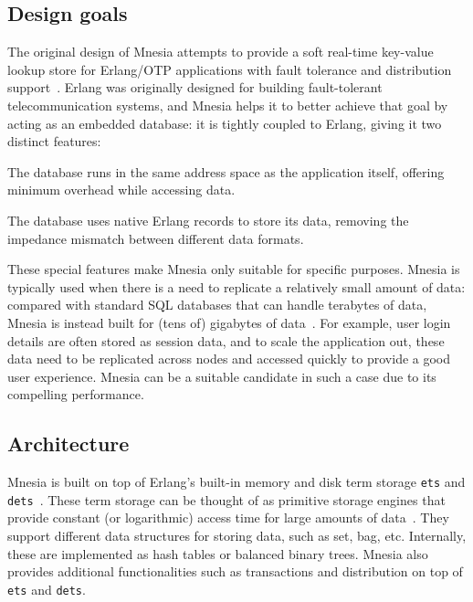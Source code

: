 \subsection{Design goals} \label{subsec:bg mnesia design goal}

The original design of Mnesia attempts to provide a soft real-time key-value
lookup store for Erlang/OTP applications with fault tolerance and distribution
support~\cite{ericssonab2023mnesiaguide}.
Erlang was originally designed for building fault-tolerant telecommunication systems,
and Mnesia helps it to better achieve that goal by acting as an embedded database: 
it is tightly coupled to Erlang, giving it two distinct features:
\begin{enumerate*}[(a)]
  \item The database runs in the same address space as the application itself,
  offering minimum overhead while accessing data.
  \item The database uses native Erlang records to store its data,
  removing the impedance mismatch between different data formats.
\end{enumerate*}

These special features make Mnesia only suitable for specific purposes.
Mnesia is typically used when there is a need to replicate a 
relatively small amount of data: compared with standard SQL databases that can
handle terabytes of data, Mnesia is instead built for (tens of) gigabytes of 
data~\cite{hebert2013LYSE}.
For example, user login details are often stored as session data, and to 
scale the application out, these data need to be replicated across
nodes and accessed quickly to provide a good user experience. 
Mnesia can be a suitable candidate in such a case due to its compelling performance.

\subsection{Architecture} \label{subsec:bg mnesia arch}

Mnesia is built on top of Erlang's built-in memory and disk term storage
\texttt{ets} and \texttt{dets}~\cite{ericssonab2023stdlib}.  These term storage
can be thought of as primitive storage engines that provide constant (or
logarithmic) access time for large amounts of data~\cite{hebert2013LYSE}.
They support different data structures for storing data, such as set, 
bag, etc.  Internally, these are implemented as hash tables or balanced binary trees.
Mnesia also provides additional functionalities such as transactions and 
distribution on top of \texttt{ets} and \texttt{dets}.

